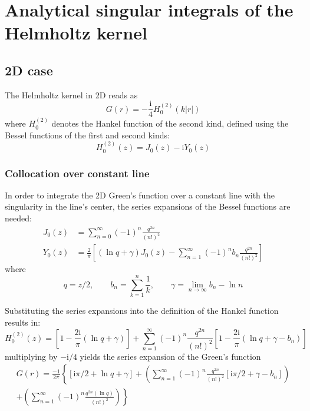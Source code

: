 \documentclass[a4paper,11pt]{article}
\newcommand{\ti}{\mathrm{i}}
\begin{document}
\section{Analytical singular integrals of the Helmholtz kernel}

\subsection{2D case}

The Helmholtz kernel in 2D reads as
%
\begin{equation}
G(r) = -\frac{\ti}{4}H^{(2)}_0(k|r|)
\end{equation}
%
where $H_0^{(2)}$ denotes the Hankel function of the second kind, defined using the Bessel functions of the first and second kinds:
%
\begin{equation}
H^{(2)}_0(z) = J_0(z) - \ti Y_0(z)
\end{equation}


\subsubsection{Collocation over constant line}

In order to integrate the 2D Green's function over a constant line with the singularity in the line's center, the series expansions of the Bessel functions are needed:
%
\begin{align}
J_0(z) &= \sum_{n=0}^{\infty} (-1)^n \frac{q^{2n}}{\left(n!\right)^2} \\
Y_0(z) &= \frac{2}{\pi} \left[
	\left(\ln q +\gamma\right)J_0(z)
	-
	\sum_{n=1}^{\infty} (-1)^{n} b_n \frac{q^{2n}}{\left(n!\right)^2}
\right]
\end{align}
%
where
%
\begin{equation}
q = z/2, \qquad b_n = \sum_{k=1}^n \frac{1}{k}, \qquad \gamma = \lim_{n\to\infty} b_n - \ln n
\end{equation}

Substituting the series expansions into the definition of the Hankel function results in:
%
\begin{equation}
H^{(2)}_0(z) =
\left[1 - \frac{2 \ti}{\pi} \left(\ln q +\gamma\right) \right]	
+
\sum_{n=1}^{\infty} (-1)^n \frac{q^{2n}}{\left(n!\right)^2}
\left[1 - \frac{2 \ti}{\pi} \left(\ln q +\gamma - b_n\right) \right]
\end{equation}
%
multiplying by $-\ti/4$ yields the series expansion of the Green's function
%
\begin{multline}
G(r) = \frac{-1}{2\pi} \left\{
\left[\ti\pi/2 + \ln q +\gamma \right]	
+ \left(\sum_{n=1}^{\infty}
(-1)^n \frac{q^{2n}}{\left(n!\right)^2}
\left[\ti\pi/2 + \gamma - b_n \right]	\right) \right. \\
\left.
+
\left(\sum_{n=1}^{\infty}
(-1)^n \frac{q^{2n}\left(\ln q\right)}{\left(n!\right)^2}
\right)
\right\}
\end{multline}
\end{document}
